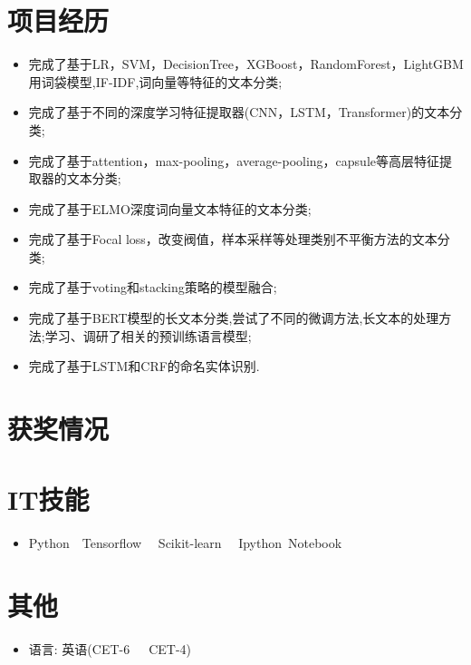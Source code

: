 \documentclass{resume}
\begin{document}
\section{项目经历}
\begin{itemize}
  \item 完成了基于LR，SVM，DecisionTree，XGBoost，RandomForest，LightGBM用词袋模型,IF-IDF,词向量等特征的文本分类;
  \item 完成了基于不同的深度学习特征提取器(CNN，LSTM，Transformer)的文本分类;
  \item 完成了基于attention，max-pooling，average-pooling，capsule等高层特征提取器的文本分类;
  \item 完成了基于ELMO深度词向量文本特征的文本分类;
  \item 完成了基于Focal loss，改变阀值，样本采样等处理类别不平衡方法的文本分类;
  \item 完成了基于voting和stacking策略的模型融合;
  \item 完成了基于BERT模型的长文本分类,尝试了不同的微调方法,长文本的处理方法;学习、调研了相关的预训练语言模型;
  \item 完成了基于LSTM和CRF的命名实体识别.
\end{itemize}


\section{获奖情况}

\section{IT技能}
\begin{itemize}[parsep=0.5ex]
  \item Python\ \ Tensorflow \ \ Scikit-learn \ \ Ipython\ Notebook 
\end{itemize}


\section{其他}
\begin{itemize}[parsep=0.5ex]
  \item 语言: 英语(CET-6\ \ \ CET-4)
\end{itemize}
\end{document}
